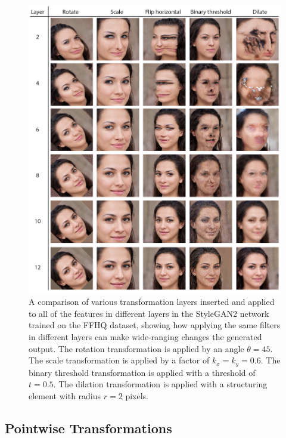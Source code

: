 \begin{figure}[htbp]
    \centering
    \includegraphics[width=1\textwidth]{figures/c5_netbend/misc/transform-comparison.png}
    \caption[Comparsion of various transformation layers applied in different layers of StyleGAN2]{A comparison of various transformation layers inserted and applied to all of the features in different layers in the StyleGAN2 network trained on the FFHQ dataset, showing how applying the same filters in different layers can make wide-ranging changes the generated output. The rotation transformation is applied by an angle $\theta=45$. The scale transformation is applied by a factor of $k_{x}=k_{y}=0.6$. The binary threshold transformation is applied with a threshold of $t=0.5$. The dilation transformation is applied with a structuring element with radius $r=2$ pixels.}
    \label{fig:c5:layerwide_comparison}
\end{figure}


\subsection{Pointwise Transformations}

